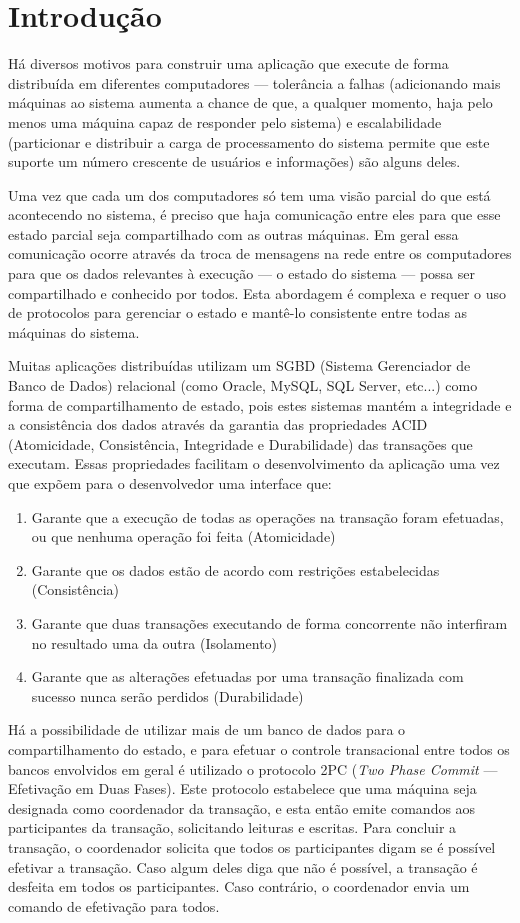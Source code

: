 \documentclass[11pt,twoside,a4paper]{book}
\begin{document}
\chapter{Introdução}
\label{chap:introducao}
Há diversos motivos para construir uma aplicação que execute de forma distribuída em diferentes computadores --- tolerância a falhas (adicionando mais máquinas ao sistema aumenta a chance de que, a qualquer momento, haja pelo menos uma máquina capaz de responder pelo sistema) e escalabilidade (particionar e distribuir a carga de processamento do sistema permite que este suporte um número crescente de usuários e informações) são alguns deles.

Uma vez que cada um dos computadores só tem uma visão parcial do que está acontecendo no sistema, é preciso que haja comunicação entre eles para que esse estado parcial seja compartilhado com as outras máquinas. Em geral essa comunicação ocorre através da troca de mensagens na rede entre os computadores para que os dados relevantes à execução --- o estado do sistema --- possa ser compartilhado e conhecido por todos. Esta abordagem é complexa e requer o uso de protocolos para gerenciar o estado e mantê-lo consistente entre todas as máquinas do sistema.

Muitas aplicações distribuídas utilizam um SGBD (Sistema Gerenciador de Banco de Dados) relacional (como Oracle, MySQL, SQL Server, etc...) como forma de compartilhamento de estado, pois estes sistemas mantém a integridade e a consistência dos dados através da garantia das propriedades ACID (Atomicidade, Consistência, Integridade e Durabilidade) das transações que executam. Essas propriedades facilitam o desenvolvimento da aplicação uma vez que expõem para o desenvolvedor uma interface que:
\begin{enumerate}
	\item Garante que a execução de todas as operações na transação foram efetuadas, ou que nenhuma operação foi feita (Atomicidade)
	\item Garante que os dados estão de acordo com restrições estabelecidas (Consistência)
	\item Garante que duas transações executando de forma concorrente não interfiram no resultado uma da outra (Isolamento)
	\item Garante que as alterações efetuadas por uma transação finalizada com sucesso nunca serão perdidos (Durabilidade)
\end{enumerate}

Há a possibilidade de utilizar mais de um banco de dados para o compartilhamento do estado, e para efetuar o controle transacional entre todos os bancos envolvidos em geral é utilizado o protocolo 2PC (\emph{Two Phase Commit} --- Efetivação em Duas Fases). Este protocolo estabelece que uma máquina seja designada como coordenador da transação, e esta então emite comandos aos participantes da transação, solicitando leituras e escritas. Para concluir a transação, o coordenador solicita que todos os participantes digam se é possível efetivar a transação. Caso algum deles diga que não é possível, a transação é desfeita em todos os participantes. Caso contrário, o coordenador envia um comando de efetivação para todos.
\end{document}
